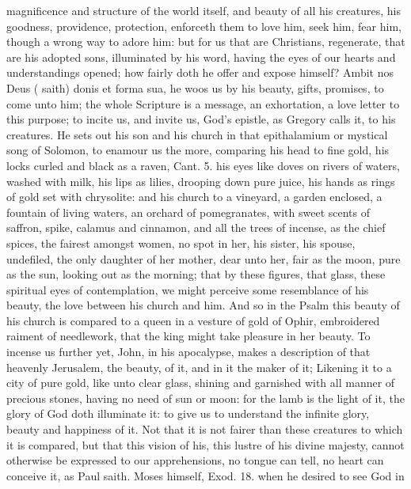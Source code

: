 {magnificence and structure of the world itself, and beauty of all his
creatures, his goodness, providence, protection, enforceth them to love
him, seek him, fear him, though a wrong way to adore him: but for us
that are Christians, regenerate, that are his adopted sons, illuminated
by his word, having the eyes of our hearts and understandings opened;
how fairly doth he offer and expose himself? Ambit nos Deus (\Austin{}
saith) donis et forma sua, he woos us by his beauty, gifts, promises,
to come unto him; the whole Scripture is a message, an
exhortation, a love letter to this purpose; to incite us, and invite
us, God's epistle, as Gregory calls it, to his creatures. He sets
out his son and his church in that epithalamium or mystical song of
Solomon, to enamour us the more, comparing his head to fine gold, his
locks curled and black as a raven, Cant.  5. his eyes like doves on
rivers of waters, washed with milk, his lips as lilies, drooping down
pure juice, his hands as rings of gold set with chrysolite: and his
church to a vineyard, a garden enclosed, a fountain of living waters,
an orchard of pomegranates, with sweet scents of saffron, spike,
calamus and cinnamon, and all the trees of incense, as the chief
spices, the fairest amongst women, no spot in her, his sister,
his spouse, undefiled, the only daughter of her mother, dear unto her,
fair as the moon, pure as the sun, looking out as the morning; that by
these figures, that glass, these spiritual eyes of contemplation, we
might perceive some resemblance of his beauty, the love between his
church and him. And so in the  Psalm this beauty of his church is
compared to a queen in a vesture of gold of Ophir, embroidered raiment
of needlework, that the king might take pleasure in her beauty. To
incense us further yet, John, in his apocalypse, makes a
description of that heavenly Jerusalem, the beauty, of it, and in it
the maker of it; Likening it to a city of pure gold, like unto clear
glass, shining and garnished with all manner of precious stones, having
no need of sun or moon: for the lamb is the light of it, the glory of
God doth illuminate it: to give us to understand the infinite glory,
beauty and happiness of it. Not that it is not fairer than these%
creatures to which it is compared, but that this vision of his, this
lustre of his divine majesty, cannot otherwise be expressed to our
apprehensions, no tongue can tell, no heart can conceive it, as Paul
saith. Moses himself, Exod.  18. when he desired to see God in
}

